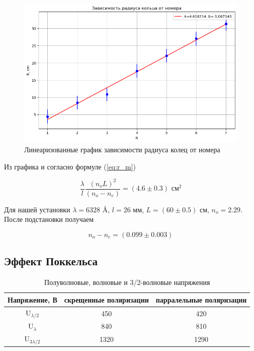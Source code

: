 \documentclass{article}
\begin{document}
\newpage

\begin{figure}[h]
    \center\includegraphics[width = 0.9\linewidth]{pictures/data1.png}
    \caption{Линеаризованные график зависимости радиуса колец от номера}\label{fig:r_m}
\end{figure}

Из графика и согласно формуле (\ref{eq:r_m})

\begin{equation*}
    \frac{\lambda}{l} \frac{{(n_o L)}^2}{(n_o - n_e)} = (4.6 \pm 0.3) \text{ см}^2
\end{equation*}

Для нашей установки $\lambda = 6328$ \AA, $l = 26$ мм, $L = (60 \pm 0.5)$ см,
$n_o = 2.29$. После подстановки получаем

\begin{equation}
    n_o - n_e = (0.099 \pm 0.003)
\end{equation}

\subsection{Эффект Поккельса}

\begin{table}[h]
\begin{center}
\begin{tabular}{ccc}
\toprule
Напряжение, В & скрещенные поляризации & парралельные поляризации\\
\midrule
U$_{\lambda/2}$ & 450 & 420\\
U$_{\lambda}$ & 840 & 810 \\
U$_{3\lambda/2}$ & 1320 & 1290\\
\bottomrule
\end{tabular}
\caption{Полуволновые, волновые и 3/2-волновые напряжения}
\end{center}
\end{table}
\end{document}

